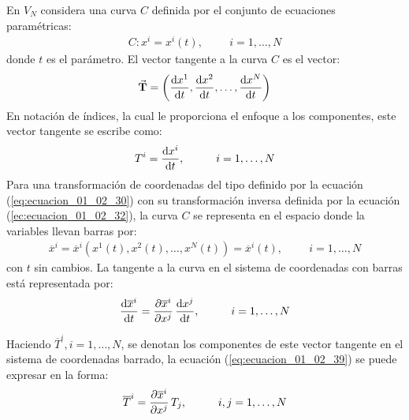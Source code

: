\documentclass[hidelinks,12pt]{article}
\begin{document}
En $V_{N}$ considera una curva $C$ definida por el conjunto de ecuaciones paramétricas:
\begin{align*}
C: x^{i} = x^{i} (t), \hspace{1cm} i = 1, \ldots, N
\end{align*}
donde $t$ es el parámetro. El vector tangente a la curva $C$ es el vector:
\begin{align*}
\va{T} = \left( \dv{x^{1}}{t}, \dv{x^{2}}{t}, \ldots, \dv{x^{N}}{t} \right)
\end{align*}
En notación de índices, la cual le proporciona el enfoque a los componentes, este vector tangente se escribe como:
\begin{align*}
T^{i} = \dv{x^{i}}{t}, \hspace{1cm} i = 1, \ldots, N
\end{align*}
Para una transformación de coordenadas del tipo definido por la ecuación (\ref{eq:ecuacion_01_02_30}) con su transformación inversa definida por la ecuación (\ref{ec:ecuacion_01_02_32}), la curva $C$ se representa en el espacio donde la variables llevan barras por:
\begin{align*}
\overline{x}^{i} = \overline{x}^{i} (x^{1} (t), x^{2} (t), \ldots, x^{N} (t)) = \overline{x}^{i} (t), \hspace{1cm} i = 1, \ldots, N
\end{align*}
con $t$ sin cambios. La tangente a la curva en el sistema de coordenadas con barras está representada por:
\begin{align}
\dv{\overline{x}^{i}}{t} = \pdv{\overline{x}^{i}}{x^{j}} \, \dv{x^{j}}{t}, \hspace{1cm} i = 1, \ldots, N
\label{eq:ecuacion_01_02_39}
\end{align}

Haciendo $\overline{T}^{i}, i = 1, \ldots, N$, se denotan los componentes de este vector tangente en el sistema de coordenadas barrado, la ecuación (\ref{eq:ecuacion_01_02_39}) se puede expresar en la forma:
\begin{align}
\overline{T}^{i} = \pdv{\overline{x}^{i}}{x^{j}} \, T_{j}, \hspace{1cm} i, j = 1, \ldots, N
\label{eq:ecuacion_01_02_40} 
\end{align}
\end{document}
